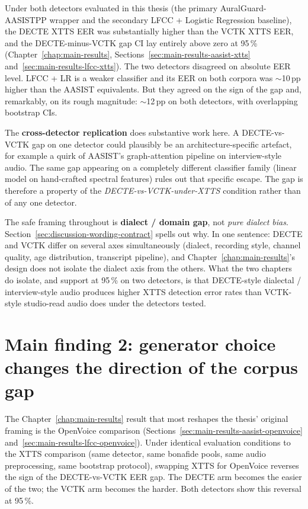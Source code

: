 Under both detectors evaluated in this thesis (the primary
AuralGuard-AASISTPP wrapper and the secondary LFCC + Logistic
Regression baseline), the DECTE XTTS EER was substantially higher
than the VCTK XTTS EER, and the DECTE-minus-VCTK gap CI lay
entirely above zero at 95\,\% (Chapter~\ref{chap:main-results}, Sections~\ref{sec:main-results-aasist-xtts} and~\ref{sec:main-results-lfcc-xtts}). The
two detectors disagreed on absolute EER level. LFCC + LR is a
weaker classifier and its EER on both corpora was $\sim$10\,pp
higher than the AASIST equivalents. But they agreed on the sign of
the gap and, remarkably, on its rough magnitude: $\sim$12\,pp on
both detectors, with overlapping bootstrap CIs.

The \textbf{cross-detector replication} does substantive work here.
A DECTE-vs-VCTK gap on one detector could plausibly be an
architecture-specific artefact, for example a quirk of AASIST's
graph-attention pipeline on interview-style audio. The same gap
appearing on a completely different classifier family (linear model
on hand-crafted spectral features) rules out that specific escape.
The gap is therefore a property of the \emph{DECTE-vs-VCTK-under-XTTS}
condition rather than of any one detector.

The safe framing throughout is \textbf{dialect / domain gap}, not
\emph{pure dialect bias}. Section~\ref{sec:discussion-wording-contract} spells out why. In one sentence:
DECTE and VCTK differ on several axes simultaneously (dialect,
recording style, channel quality, age distribution, transcript
pipeline), and Chapter~\ref{chap:main-results}'s design does not isolate the dialect
axis from the others. What the two chapters do isolate, and
support at 95\,\% on two detectors, is that DECTE-style
dialectal / interview-style audio produces higher XTTS detection
error rates than VCTK-style studio-read audio does under the
detectors tested.


\section{Main finding 2: generator choice changes the direction of the corpus gap}
\label{sec:discussion-rq2}

The Chapter~\ref{chap:main-results} result that most reshapes the thesis' original
framing is the OpenVoice comparison (Sections~\ref{sec:main-results-aasist-openvoice} and~\ref{sec:main-results-lfcc-openvoice}). Under
identical evaluation conditions to the XTTS comparison (same
detector, same bonafide pools, same audio preprocessing, same
bootstrap protocol), swapping XTTS for OpenVoice reverses the
sign of the DECTE-vs-VCTK EER gap. The DECTE arm becomes the
easier of the two; the VCTK arm becomes the harder. Both
detectors show this reversal at 95\,\%.


